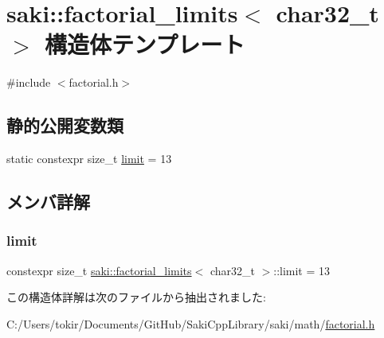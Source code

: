 \hypertarget{structsaki_1_1factorial__limits_3_01char32__t_01_4}{}\section{saki\+:\+:factorial\+\_\+limits$<$ char32\+\_\+t $>$ 構造体テンプレート}
\label{structsaki_1_1factorial__limits_3_01char32__t_01_4}


{\ttfamily \#include $<$factorial.\+h$>$}

\subsection*{静的公開変数類}
\begin{DoxyCompactItemize}
\item 
static constexpr size\+\_\+t \mbox{\hyperlink{structsaki_1_1factorial__limits_3_01char32__t_01_4_a8cc78d22e64b9df60a0bb582890bec00}{limit}} = 13
\end{DoxyCompactItemize}


\subsection{メンバ詳解}
\mbox{\label{structsaki_1_1factorial__limits_3_01char32__t_01_4_a8cc78d22e64b9df60a0bb582890bec00}} 
\subsubsection{\texorpdfstring{limit}{limit}}
{\footnotesize\ttfamily constexpr size\+\_\+t \mbox{\hyperlink{structsaki_1_1factorial__limits}{saki\+::factorial\+\_\+limits}}$<$ char32\+\_\+t $>$\+::limit = 13\hspace{0.3cm}{\ttfamily [static]}}



この構造体詳解は次のファイルから抽出されました\+:\begin{DoxyCompactItemize}
\item 
C\+:/\+Users/tokir/\+Documents/\+Git\+Hub/\+Saki\+Cpp\+Library/saki/math/\mbox{\hyperlink{factorial_8h}{factorial.\+h}}\end{DoxyCompactItemize}
